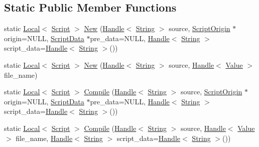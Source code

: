 \subsection*{Static Public Member Functions}
\begin{DoxyCompactItemize}
\item 
static \hyperlink{classv8_1_1_local}{Local}$<$ \hyperlink{classv8_1_1_script}{Script} $>$ \hyperlink{classv8_1_1_script_a9f36775d3dfa63a02d265bb265e94638}{New} (\hyperlink{classv8_1_1_handle}{Handle}$<$ \hyperlink{classv8_1_1_string}{String} $>$ source, \hyperlink{classv8_1_1_script_origin}{Script\+Origin} $\ast$origin=N\+U\+L\+L, \hyperlink{classv8_1_1_script_data}{Script\+Data} $\ast$pre\+\_\+data=N\+U\+L\+L, \hyperlink{classv8_1_1_handle}{Handle}$<$ \hyperlink{classv8_1_1_string}{String} $>$ script\+\_\+data=\hyperlink{classv8_1_1_handle}{Handle}$<$ \hyperlink{classv8_1_1_string}{String} $>$())
\item 
static \hyperlink{classv8_1_1_local}{Local}$<$ \hyperlink{classv8_1_1_script}{Script} $>$ \hyperlink{classv8_1_1_script_aebbe434ea4df560ffc8eb290f7ac284b}{New} (\hyperlink{classv8_1_1_handle}{Handle}$<$ \hyperlink{classv8_1_1_string}{String} $>$ source, \hyperlink{classv8_1_1_handle}{Handle}$<$ \hyperlink{classv8_1_1_value}{Value} $>$ file\+\_\+name)
\item 
static \hyperlink{classv8_1_1_local}{Local}$<$ \hyperlink{classv8_1_1_script}{Script} $>$ \hyperlink{classv8_1_1_script_a55964f8e427dfa4d0fef33a9998cebc3}{Compile} (\hyperlink{classv8_1_1_handle}{Handle}$<$ \hyperlink{classv8_1_1_string}{String} $>$ source, \hyperlink{classv8_1_1_script_origin}{Script\+Origin} $\ast$origin=N\+U\+L\+L, \hyperlink{classv8_1_1_script_data}{Script\+Data} $\ast$pre\+\_\+data=N\+U\+L\+L, \hyperlink{classv8_1_1_handle}{Handle}$<$ \hyperlink{classv8_1_1_string}{String} $>$ script\+\_\+data=\hyperlink{classv8_1_1_handle}{Handle}$<$ \hyperlink{classv8_1_1_string}{String} $>$())
\item 
static \hyperlink{classv8_1_1_local}{Local}$<$ \hyperlink{classv8_1_1_script}{Script} $>$ \hyperlink{classv8_1_1_script_ab867221dfb123d88059a88a6b69added}{Compile} (\hyperlink{classv8_1_1_handle}{Handle}$<$ \hyperlink{classv8_1_1_string}{String} $>$ source, \hyperlink{classv8_1_1_handle}{Handle}$<$ \hyperlink{classv8_1_1_value}{Value} $>$ file\+\_\+name, \hyperlink{classv8_1_1_handle}{Handle}$<$ \hyperlink{classv8_1_1_string}{String} $>$ script\+\_\+data=\hyperlink{classv8_1_1_handle}{Handle}$<$ \hyperlink{classv8_1_1_string}{String} $>$())
\end{DoxyCompactItemize}
